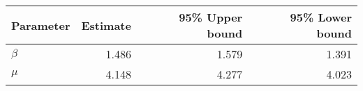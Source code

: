 \begin{tabular}{lrrr}
\toprule
Parameter &  Estimate &  95\% Upper bound &  95\% Lower bound \\
\midrule
  $\beta$ &     1.486 &             1.579 &             1.391 \\
    $\mu$ &     4.148 &             4.277 &             4.023 \\
\bottomrule
\end{tabular}
